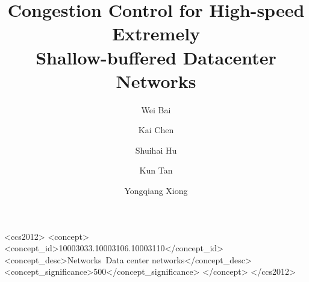 \documentclass[10pt, sigconf]{acmart}
\begin{document}

\title{Congestion Control for High-speed Extremely\\Shallow-buffered Datacenter Networks}


\author{Wei Bai}

\author{Kai Chen}

\author{Shuihai Hu}



\author{Kun Tan}

\author{Yongqiang Xiong}


\renewcommand{\shortauthors}{W. Bai et al.}
\renewcommand{\textrightarrow}{$\rightarrow$}

\begin{abstract}

\end{abstract}

\begin{CCSXML}
<ccs2012>
<concept>
<concept_id>10003033.10003106.10003110</concept_id>
<concept_desc>Networks~Data center networks</concept_desc>
<concept_significance>500</concept_significance>
</concept>
</ccs2012>
\end{CCSXML}



\maketitle













\end{document}
